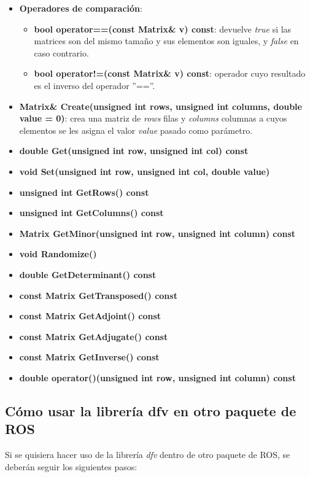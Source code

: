\documentclass[12pt, a4paper]{report}
\begin{document}
\begin{itemize}
\item \textbf{Operadores de comparación}:

\begin{itemize}
\item \textbf{bool operator==(const Matrix\& v) const}: devuelve \textit{true} si las matrices son del mismo tamaño y sus elementos son iguales, y \textit{false} en caso contrario.
\item \textbf{bool operator!=(const Matrix\& v) const}: operador cuyo resultado es el inverso del operador ''==''. 
\end{itemize}

\item \textbf{Matrix\& Create(unsigned int rows, unsigned int columns, double value = 0)}: crea una matriz de \textit{rows} filas y \textit{columns} columnas a cuyos elementos se les asigna el valor \textit{value} pasado como parámetro.
\item \textbf{double Get(unsigned int row, unsigned int col) const}
\item \textbf{void Set(unsigned int row, unsigned int col, double value)}
\item \textbf{unsigned int GetRows() const}
\item \textbf{unsigned int GetColumns() const}
\item \textbf{Matrix GetMinor(unsigned int row, unsigned int column) const}
\item \textbf{void Randomize()}
\item \textbf{double GetDeterminant() const}
\item \textbf{const Matrix GetTransposed() const}
\item \textbf{const Matrix GetAdjoint() const}
\item \textbf{const Matrix GetAdjugate() const}
\item \textbf{const Matrix GetInverse() const}
\item \textbf{double operator()(unsigned int row, unsigned int column) const}

\end{itemize}

\subsection{Cómo usar la librería dfv en otro paquete de ROS}

Si se quisiera hacer uso de la librería \textit{dfv} dentro de otro paquete de ROS, se deberán seguir los siguientes pasos:
\end{document}
